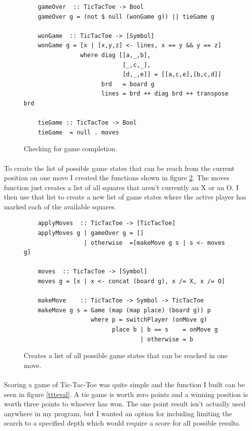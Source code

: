 \documentclass[10pt]{article}
\begin{document}
    \begin{figure}[ht]
        \centering
        \begin{verbatim}
    gameOver  :: TicTacToe -> Bool
    gameOver g = (not $ null (wonGame g)) || tieGame g

    wonGame  :: TicTacToe -> [Symbol]
    wonGame g = [x | [x,y,z] <- lines, x == y && y == z]
                where diag [[a,_,b],
                            [_,c,_],
                            [d,_,e]] = [[a,c,e],[b,c,d]]
                      brd   = board g
                      lines = brd ++ diag brd ++ transpose brd

    tieGame :: TicTacToe -> Bool
    tieGame  = null . moves        \end{verbatim}
        \caption{Checking for game completion.} \label{tttover}
    \end{figure}

    \paragraph{} To create the list of possible game states that can be reach from the 
    current position on one move I created the functions shown in figure \ref{tttmoves}.
    The moves function just creates a list of all squares that aren't currently an X 
    or an O.  I then use that list to create a new list of game states where the 
    active player has marked each of the available squares.

    \begin{figure}[ht]
        \centering
        \begin{verbatim}
    applyMoves  :: TicTacToe -> [TicTacToe]
    applyMoves g | gameOver g = []
                 | otherwise  =[makeMove g s | s <- moves g]

    moves  :: TicTacToe -> [Symbol]
    moves g = [x | x <- concat (board g), x /= X, x /= O]
    
    makeMove    :: TicTacToe -> Symbol -> TicTacToe
    makeMove g s = Game (map (map place) (board g)) p
                   where p = switchPlayer (onMove g)
                         place b | b == s    = onMove g
                                 | otherwise = b        \end{verbatim}
        \caption{Creates a list of all possible game states that can be reached
        in one move.} \label{tttmoves}
    \end{figure}

    \paragraph{} Scoring a game of Tic-Tac-Toe was quite simple and the function I
    built can be seen in figure \ref{ttteval}.  A tie game is worth zero points and
    a winning position is worth three points to whoever has won.  The one point result
    isn't actually used anywhere in my program, but I wanted an option for including 
    limiting the search to a specified depth which would require a score for all possible 
    results.
\end{document}
